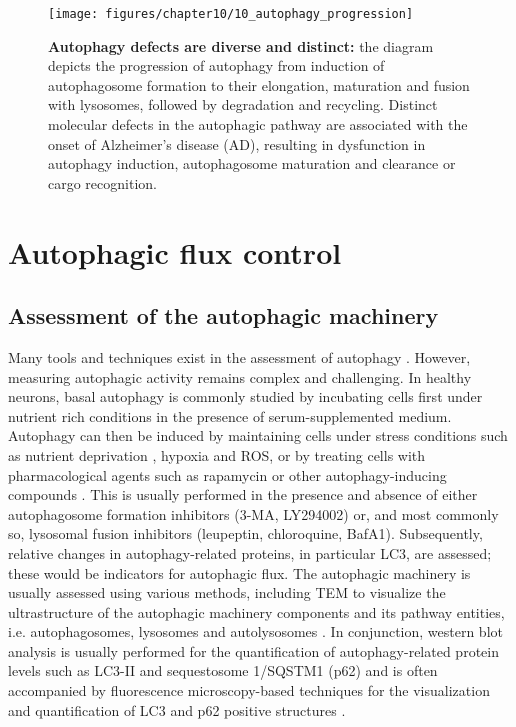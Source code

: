 \begin{figure}[!htbp]
  \texttt{[image: figures/chapter10/10\_autophagy\_progression]}
  \caption[Diverse and distinct autophagy defects]{\textbf{Autophagy defects are diverse and distinct:} the diagram depicts the progression of autophagy from induction of autophagosome formation to their elongation, maturation and fusion with lysosomes, followed by degradation and recycling. Distinct molecular defects in the autophagic pathway are associated with the onset of Alzheimer’s disease (AD), resulting in dysfunction in autophagy induction, autophagosome maturation and clearance or cargo recognition.}
  \label{fig:10_autophagy_progression}
\end{figure}

\section{Autophagic flux control}
\subsection{Assessment of the autophagic machinery}
Many tools and techniques exist in the assessment of autophagy \citep{klionsky2016}. However, measuring autophagic activity remains complex and challenging. In healthy neurons, basal autophagy is commonly studied by incubating cells first under nutrient rich conditions in the presence of serum-supplemented medium. Autophagy can then be induced by maintaining cells under stress conditions such as nutrient deprivation \citep{Alirezaei2010}, hypoxia and ROS, or by treating cells with pharmacological agents such as rapamycin or other autophagy-inducing compounds \citep{Boland2008,Rose2010}. This is usually performed in the presence and absence of either autophagosome formation inhibitors (3-MA, LY294002) or, and most commonly so, lysosomal fusion inhibitors (leupeptin, chloroquine, BafA1). Subsequently, relative changes in autophagy-related proteins, in particular LC3, are assessed; these would be indicators for autophagic flux. The autophagic machinery is usually assessed using various methods, including TEM to visualize the ultrastructure of the autophagic machinery components and its pathway entities, i.e. autophagosomes, lysosomes and autolysosomes \citep{klionsky2016}. In conjunction, western blot analysis is usually performed for the quantification of autophagy-related protein levels such as LC3-II and sequestosome 1/SQSTM1 (p62) and is often accompanied by fluorescence microscopy-based techniques for the visualization and quantification of LC3 and p62 positive structures \citep{klionsky2016,Klionsky2012,Mizushima2007,Swanlund2010}.

